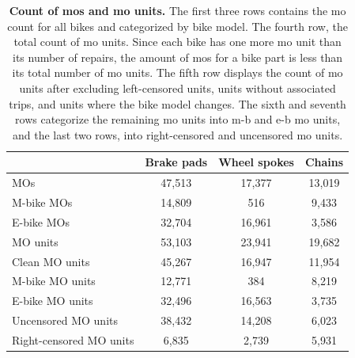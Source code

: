     \begin{table}[ht!]
        \centering
        \caption[Count of MOs and MO units]{
            \textbf{Count of \acp{mo} and \ac{mo} units.} 
            The first three rows contains the \ac{mo} count for all bikes and categorized by bike model. The fourth row, the total count of \ac{mo} units. Since each bike has one more \ac{mo} unit than its number of repairs, the amount of \acp{mo} for a bike part is less than its total number of \ac{mo} units. The fifth row displays the count of \ac{mo} units after excluding left-censored units, units without associated trips, and units where the bike model changes. The sixth and seventh rows categorize the remaining \ac{mo} units into \ac{m-b} and \ac{e-b} \ac{mo} units, and the last two rows, into right-censored and uncensored \ac{mo} units.
        }
        \label{tab:MO_units_cleaning}
        \begin{tabular}{lccc}
            \hline
            & \textbf{Brake pads} & \textbf{Wheel spokes} & \textbf{Chains} \\
            \hline
            MOs & 47,513 & 17,377 & 13,019 \\
            M-bike MOs & 14,809 & 516 & 9,433 \\
            E-bike MOs & 32,704 & 16,961 & 3,586 \\
            \hline
            MO units & 53,103 & 23,941 & 19,682 \\
            Clean MO units & 45,267 & 16,947 & 11,954 \\
            \hline
            M-bike MO units & 12,771 & 384 & 8,219 \\
            E-bike MO units & 32,496 & 16,563 & 3,735 \\
            \hline
            Uncensored MO units & 38,432 & 14,208 & 6,023 \\
            Right-censored MO units & 6,835 & 2,739 & 5,931 \\
            \hline
    \end{tabular}
    
    \end{table}
    
